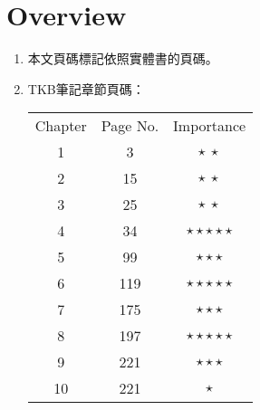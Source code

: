 \section{Overview}

\begin{enumerate}
    \item 本文頁碼標記依照實體書\cite{1}的頁碼。
    \item TKB筆記\cite{2}章節頁碼：
    \begin{table}[H]
        \centering
        \begin{tabular}{|c|c|c|}
            \hline
            Chapter & Page No. & Importance \\
            \Xhline{2\arrayrulewidth}
            1 & 3 & $\star \ \star$ \\
            \hline
            2 & 15 & $\star \ \star$ \\
            \hline
            3 & 25 & $\star \ \star$ \\
            \hline
            4 & 34 & $\star\star\star\star\star$ \\
            \hline
            5 & 99 & $\star\star\star$ \\
            \hline
            6 & 119 & $\star\star\star\star\star$ \\
            \hline
            7 & 175 & $\star\star\star$ \\
            \hline
            8 & 197 & $\star\star\star\star\star$ \\
            \hline
            9 & 221 & $\star\star\star$ \\
            \hline
            10 & 221 & $\star$ \\
            \hline
        \end{tabular}
    \end{table}
\end{enumerate}

\pagebreak